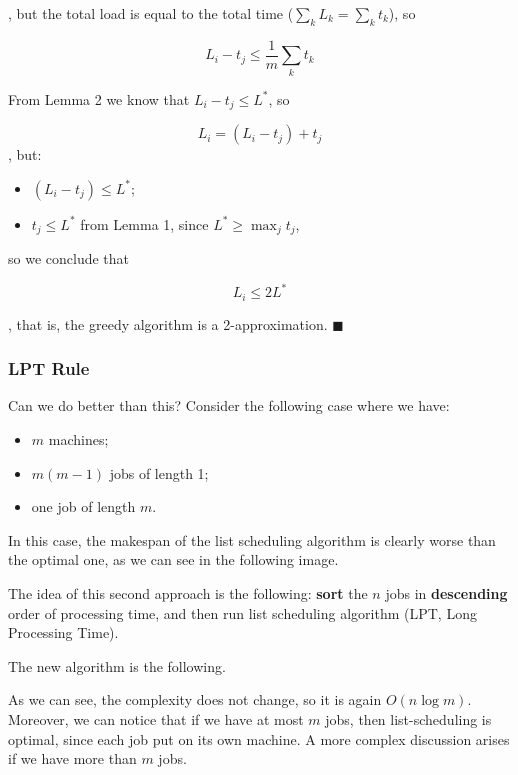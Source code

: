 , but the total load is equal to the total time ($\sum_k L_k = \sum_k t_k$), so

$$
L_i - t_j \leq \frac{1}{m} \sum_k t_k
$$

From Lemma 2 we know that $L_i - t_j \leq L^*$, so

$$
L_i = (L_i - t_j) + t_j
$$
, but:

\begin{itemize}
    \item $(L_i - t_j) \leq L^*$;
    \item $t_j \leq L^*$ from Lemma 1, since $L^* \geq \max_j t_j$,
\end{itemize}

so we conclude that 

$$
L_i \leq 2L^*
$$

, that is, the greedy algorithm is a 2-approximation. $\blacksquare$

\subsubsection{LPT Rule}

Can we do better than this? Consider the following case where we have:

\begin{itemize}
    \item $m$ machines;
    \item $m(m-1)$ jobs of length 1;
    \item one job of length $m$.
\end{itemize}

In this case, the makespan of the list scheduling algorithm is clearly worse than the optimal one, as we can see in the following image.


The idea of this second approach is the following: \textbf{sort} the $n$ jobs in \textbf{descending} order of processing time, and then run list scheduling algorithm (LPT, Long Processing Time).

The new algorithm is the following.


As we can see, the complexity does not change, so it is again $O(n \log m)$. Moreover, we can notice that if we have at most $m$ jobs, then list-scheduling is optimal, since each job put on its own machine. A more complex discussion arises if we have more than $m$ jobs.


